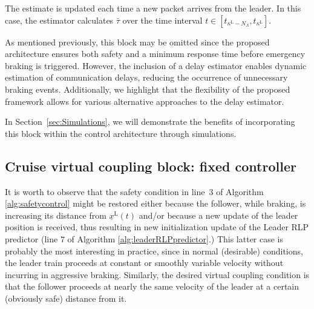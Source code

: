 \documentclass[letterpaper, 10 pt, conference]{ieeeconf}
\theoremstyle{definition}
\theoremstyle{nopoint}
\newcommand{\tildeAdd}{~}
\begin{document}
The estimate is updated each time a new packet arrives from the leader. In this case, the estimator calculates \( \bar{\tau} \) over the time interval \( t \in [t_{\kappa^\mathrm{L}-N_\Lambda}, t_{\kappa^\mathrm{L}}] \).





As mentioned previously, this block may be omitted since the proposed architecture ensures both safety and a minimum response time before emergency braking is triggered. However, the inclusion of a delay estimator enables dynamic estimation of communication delays, reducing the occurrence of unnecessary braking events.
Additionally, we highlight that the flexibility of the proposed framework allows for various alternative approaches to the delay estimator.

In Section\tildeAdd\ref{sec:Simulations}, we will demonstrate the benefits of incorporating this block within the control architecture through simulations.



 
\subsection{Cruise virtual coupling block: fixed controller}
 \label{subsec:vitrualcouplingblock} 
 
It is worth to observe that the safety condition in line\tildeAdd$3$ of  Algorithm \ref{alg:safetycontrol} might be restored either because the follower, while braking, is increasing its distance from $\underline{x}^\mathrm{L}(t)$ and/or because a new update of the leader position is received, thus resulting in new initialization update of the Leader RLP predictor (line $7$ of Algorithm \ref{alg:leaderRLPpredictor}.)
This latter case is probably the most interesting in practice, since in normal (desirable) conditions, the leader train proceeds at constant or smoothly variable velocity without incurring in aggressive braking. Similarly, the desired virtual coupling condition is that the follower proceeds at nearly the same velocity of the leader at a certain (obviously safe) distance from it. 
\end{document}
